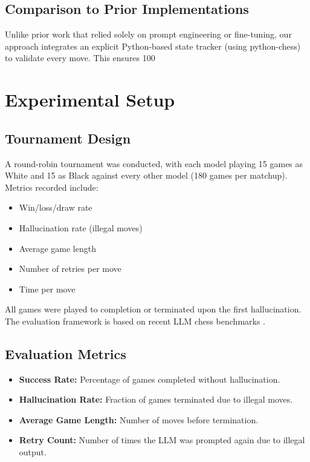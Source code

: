 \documentclass[conference]{IEEEtran}
\begin{document}
\subsection{Comparison to Prior Implementations}
Unlike prior work that relied solely on prompt engineering or fine-tuning, our approach integrates an explicit Python-based state tracker (using python-chess) to validate every move. This ensures 100%

\section{Experimental Setup}
\subsection{Tournament Design}
A round-robin tournament was conducted, with each model playing 15 games as White and 15 as Black against every other model (180 games per matchup). Metrics recorded include:
\begin{itemize}
    \item Win/loss/draw rate
    \item Hallucination rate (illegal moves)
    \item Average game length
    \item Number of retries per move
    \item Time per move
\end{itemize}
All games were played to completion or terminated upon the first hallucination. The evaluation framework is based on recent LLM chess benchmarks \cite{llm_chess_benchmark, chess_ai_benchmarks}.

\subsection{Evaluation Metrics}
\begin{itemize}
    \item \textbf{Success Rate:} Percentage of games completed without hallucination.
    \item \textbf{Hallucination Rate:} Fraction of games terminated due to illegal moves.
    \item \textbf{Average Game Length:} Number of moves before termination.
    \item \textbf{Retry Count:} Number of times the LLM was prompted again due to illegal output.
\end{itemize}
\end{document}
